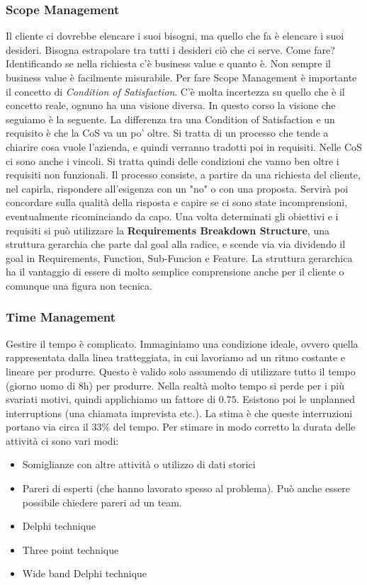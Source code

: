 \subsubsection{Scope Management}
Il cliente ci dovrebbe elencare i suoi bisogni, ma quello che fa è elencare i suoi desideri. Bisogna estrapolare tra tutti i desideri ciò che ci serve. Come fare? Identificando se nella richiesta c'è business value e quanto è. Non sempre il business value è facilmente misurabile.\newline
Per fare Scope Management è importante il concetto di \textit{Condition of Satisfaction}. C'è molta incertezza su quello che è il concetto reale, ognuno ha una visione diversa. In questo corso la visione che seguiamo è la seguente. La differenza tra una Condition of Satisfaction e un requisito è che la CoS va un po' oltre. Si tratta di un processo che tende a chiarire cosa vuole l'azienda, e quindi verranno tradotti poi in requisiti. Nelle CoS ci sono anche i vincoli. Si tratta quindi delle condizioni che vanno ben oltre i requisiti non funzionali. Il processo consiste, a partire da una richiesta del cliente, nel capirla, rispondere all'esigenza con un "no" o con una proposta. Servirà poi concordare sulla qualità della risposta e capire se ci sono state incomprensioni, eventualmente ricominciando da capo.
\noindent Una volta determinati gli obiettivi e i requisiti si può utilizzare la \textbf{Requirements Breakdown Structure}, una struttura gerarchia che parte dal goal alla radice, e scende via via dividendo il goal in Requirements, Function, Sub-Funcion e Feature. La struttura gerarchica ha il vantaggio di essere di molto semplice comprensione anche per il cliente o comunque una figura non tecnica.
\subsubsection{Time Management}
Gestire il tempo è complicato. Immaginiamo una condizione ideale, ovvero quella rappresentata dalla linea tratteggiata, in cui lavoriamo ad un ritmo costante e lineare per produrre. Questo è valido solo assumendo di utilizzare tutto il tempo (giorno uomo di 8h) per produrre. Nella realtà molto tempo si perde per i più svariati motivi, quindi applichiamo un fattore di $0.75$. Esistono poi le unplanned interruptions (una chiamata imprevista etc.). La stima è che queste interruzioni portano via circa il $33\%$ del tempo.
Per stimare in modo corretto la durata delle attività ci sono vari modi:
\begin{itemize}
	\item Somiglianze con altre attività o utilizzo di dati storici
	\item Pareri di esperti (che hanno lavorato spesso al problema). Può anche essere possibile chiedere pareri ad un team.
	\item Delphi technique
	\item Three point technique
	\item Wide band Delphi technique
\end{itemize}

